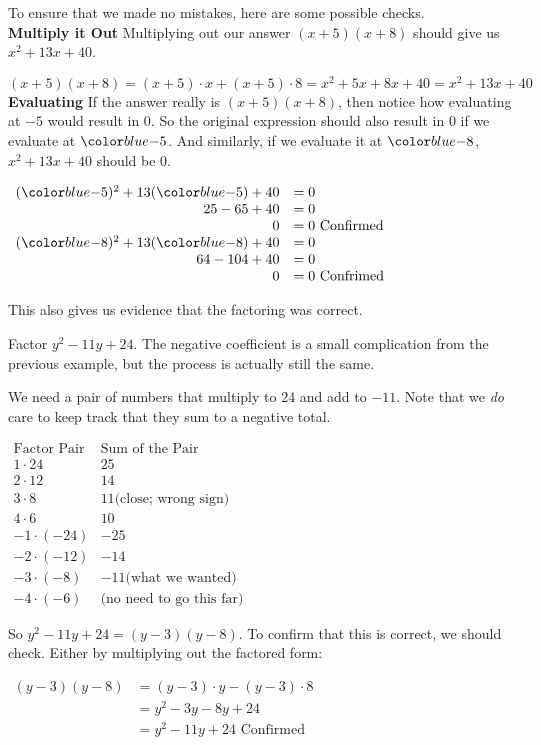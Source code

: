\documentclass{ximera}
\begin{document}
   To ensure that we made no mistakes,
      here are some possible checks.\\
\textbf{Multiply it Out}
   Multiplying out our answer
        $(x+5)(x+8)$ should give us $x^2+13x+40$.

 $(x+5)(x+8)=(x+5)\cdot x+(x+5)\cdot8
            =x^2+5x+8x+40
           = x^2+13x+40$\\
\textbf{Evaluating}
 If the answer really is $(x+5)(x+8)$,
        then notice how evaluating at $-5$ would result in $0$.
        So the original expression should also result in $0$ if we evaluate at $\substitute{-5}$.
        And similarly, if we evaluate it at $\substitute{-8}$,
        $x^2+13x+40$ should be $0$.
\begin{center}
$
\begin{array}{rl}
(\substitute{-5})^2+13(\substitute{-5})+40 & =0 \\
          25-65+40 & =0 \\
          0 &= 0 \text{ Confirmed}\\
(\substitute{-8})^2+13(\substitute{-8})+40&=0\\
64-104+40&=0\\
 0&=0 \text{ Confrimed}
\end{array}$
\end{center}
This also gives us evidence that the factoring was correct.

       Factor $y^2-11y+24$.
          The negative coefficient is a small complication from the previous example,
          but the process is actually still the same.

    We need a pair of numbers that multiply to $24$ and add to $-11$.
          Note that we \textit{do} care to keep track that they sum to a negative total.
\begin{center}
$
\begin{array}{c|l}
         \text{Factor Pair} & \text{Sum of the Pair}\\
\hline
   1\cdot24 &  25\\
2\cdot12 & 14 \\
          3\cdot8 & 11\text{(close; wrong sign)} \\
          4\cdot6 & 10 \\
           -1\cdot(-24) & -25\\
-2\cdot(-12) & -14 \\
       -3\cdot(-8) & -11 \text{(what we wanted)}\\
-4\cdot(-6) & \text{(no need to go this far)}
\end{array}
$
\end{center}
 So $y^2-11y+24=(y-3)(y-8)$.
       To confirm that this is correct, we should check.
          Either by multiplying out the factored form:
\begin{center}
$
\begin{array}{rl}
(y-3)(y-8)& =(y-3)\cdot y-(y-3)\cdot8\\
               &=y^2-3y-8y+24 \\
               &=y^2-11y+24 \text{ Confirmed}
\end{array}
$
\end{center}
\end{document}
